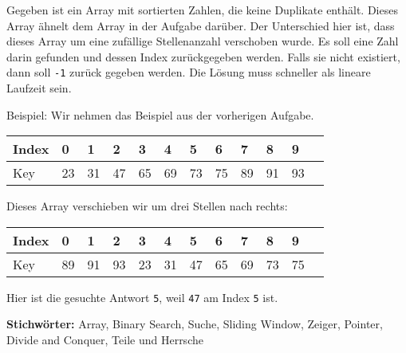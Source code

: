 \documentclass[babel]{book}
\begin{document}
\begin{examplei}
	Gegeben ist ein Array mit sortierten Zahlen, die keine Duplikate enthält. Dieses Array ähnelt dem Array in der Aufgabe darüber. Der Unterschied hier ist, dass dieses Array um eine zufällige Stellenanzahl verschoben wurde. Es soll eine Zahl darin gefunden und dessen Index zurückgegeben werden. Falls sie nicht existiert, dann soll \lstinline|-1| zurück gegeben werden. Die Lösung muss schneller als lineare Laufzeit sein.
	
	Beispiel:
	Wir nehmen das Beispiel aus der vorherigen Aufgabe.
	
	\begin{tabular}{|l|l|l|l|l|l|l|l|l|l|l|l|} 
		\hline
		Index & \cellcolor{yellow!25}0 & \cellcolor{yellow!25}1 & \cellcolor{yellow!25}2 & \cellcolor{yellow!25}3 & \cellcolor{yellow!25}4 & \cellcolor{yellow!25}5  & \cellcolor{yellow!25}6  & \cellcolor{yellow!25}7  & \cellcolor{yellow!25}8  & \cellcolor{yellow!25}9 \\ 
		\hline
		Key & \cellcolor{blue!25}23 & \cellcolor{blue!25}31 & \cellcolor{blue!25}47 & \cellcolor{blue!25}65 & \cellcolor{blue!25}69 & \cellcolor{blue!25}73 & \cellcolor{blue!25}75 & \cellcolor{blue!25}89 & \cellcolor{blue!25}91 & \cellcolor{blue!25}93 \\
		\hline
	\end{tabular}
	
	Dieses Array verschieben wir um drei Stellen nach rechts:
	
	\begin{tabular}{|l|l|l|l|l|l|l|l|l|l|l|l|} 
		\hline
		Index & \cellcolor{yellow!25}0 & \cellcolor{yellow!25}1 & \cellcolor{yellow!25}2 & \cellcolor{yellow!25}3 & \cellcolor{yellow!25}4 & \cellcolor{yellow!25}5  & \cellcolor{yellow!25}6  & \cellcolor{yellow!25}7  & \cellcolor{yellow!25}8  & \cellcolor{yellow!25}9 \\ 
		\hline
		Key & \cellcolor{green!25}89 & \cellcolor{green!25}91 & \cellcolor{green!25}93 & \cellcolor{blue!25}23 & \cellcolor{blue!25}31 & \cellcolor{blue!25}47 & \cellcolor{blue!25}65 & \cellcolor{blue!25}69 & \cellcolor{blue!25}73 & \cellcolor{blue!25}75 \\
		\hline
	\end{tabular}

Hier ist die gesuchte Antwort \lstinline|5|, weil \lstinline|47| am Index \lstinline|5| ist.	
\end{examplei}

{\bf Stichwörter:} Array, Binary Search, Suche, Sliding Window, Zeiger, Pointer, Divide and Conquer, Teile und Herrsche
\end{document}
